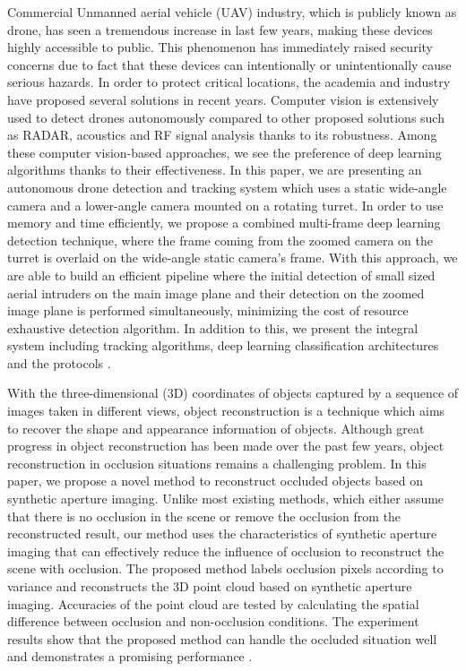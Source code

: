 Commercial Unmanned aerial vehicle (UAV) industry, which is publicly known as drone, has seen a tremendous increase in last few years, making these devices highly accessible to public. This phenomenon has immediately raised security concerns due to fact that these devices can intentionally or unintentionally cause serious hazards. In order to protect critical locations, the academia and industry have proposed several solutions in recent years. Computer vision is extensively used to detect drones autonomously compared to other proposed solutions such as RADAR, acoustics and RF signal analysis thanks to its robustness. Among these computer vision-based approaches, we see the preference of deep learning algorithms thanks to their effectiveness. In this paper, we are presenting an autonomous drone detection and tracking system which uses a static wide-angle camera and a lower-angle camera mounted on a rotating turret. In order to use memory and time efficiently, we propose a combined multi-frame deep learning detection technique, where the frame coming from the zoomed camera on the turret is overlaid on the wide-angle static camera’s frame. With this approach, we are able to build an efficient pipeline where the initial detection of small sized aerial intruders on the main image plane and their detection on the zoomed image plane is performed simultaneously, minimizing the cost of resource exhaustive detection algorithm. In addition to this, we present the integral system including tracking algorithms, deep learning classification architectures and the protocols \cite{Unlu2019}.


With the three-dimensional (3D) coordinates of objects captured by a sequence of images taken in different views, object reconstruction is a technique which aims to recover the shape and appearance information of objects. Although great progress in object reconstruction has been made over the past few years, object reconstruction in occlusion situations remains a challenging problem. In this paper, we propose a novel method to reconstruct occluded objects based on synthetic aperture imaging. Unlike most existing methods, which either assume that there is no occlusion in the scene or remove the occlusion from the reconstructed result, our method uses the characteristics of synthetic aperture imaging that can effectively reduce the influence of occlusion to reconstruct the scene with occlusion. The proposed method labels occlusion pixels according to variance and reconstructs the 3D point cloud based on synthetic aperture imaging. Accuracies of the point cloud are tested by calculating the spatial difference between occlusion and non-occlusion conditions. The experiment results show that the proposed method can handle the occluded situation well and demonstrates a promising performance \cite{Pei2019}.

